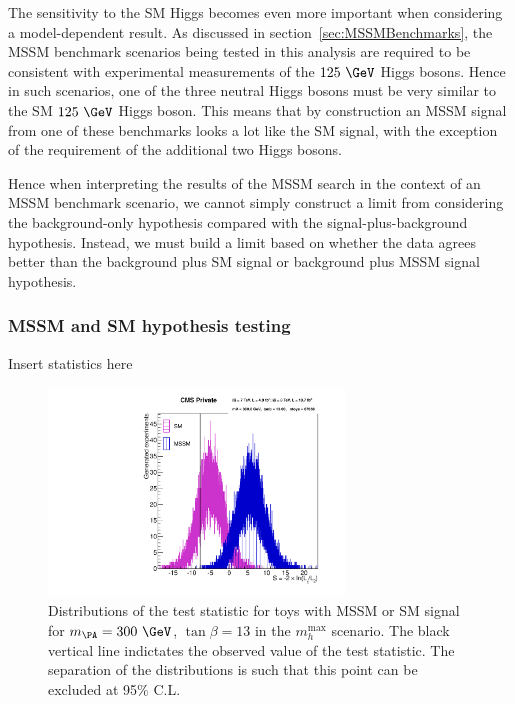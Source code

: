 The sensitivity to the \ac{SM} Higgs becomes even more important when
considering a model-dependent result. As discussed in
section~\ref{sec:MSSMBenchmarks}, the \ac{MSSM} benchmark scenarios being tested in this
analysis are required to be consistent with experimental measurements of the
$125~\GeV$ Higgs bosons. Hence in such scenarios, one of the three neutral Higgs
bosons must be very similar to the \ac{SM} $125~\GeV$ Higgs boson. This means
that by construction an \ac{MSSM} signal from one of these benchmarks looks a
lot like the \ac{SM} signal, with the exception of the requirement of the
additional two Higgs bosons.

Hence when interpreting the results of the \ac{MSSM} search in the context of an
\ac{MSSM} benchmark scenario, we cannot simply construct a limit from
considering the background-only hypothesis compared with the
signal-plus-background hypothesis. Instead, we must build a limit based on
whether the data agrees better than the background plus \ac{SM} signal or
background plus \ac{MSSM} signal hypothesis.

\subsubsection{\ac{MSSM} and \ac{SM} hypothesis testing}

Insert statistics here


\begin{figure}[tbh]
\includegraphics[width=0.7\textwidth]{plots/htt-mssm/sigsep_13.pdf}
\caption{Distributions of the test statistic for toys with \ac{MSSM} or \ac{SM}
signal for $m_{\PA} = 300~\GeV$, $\tan\beta = 13$ in the $m_{h}^{\text{max}}$
scenario. The black vertical line indictates the observed value of the test
statistic. The separation of the distributions is such that this point can be
excluded at 95$\%$ C.L.}
\label{fig:toydistribution}
\end{figure}


